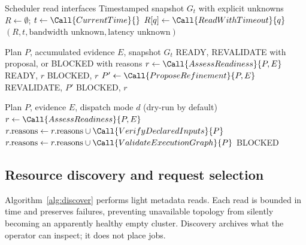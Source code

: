 \begin{algorithm}[H]
\caption{DiscoverClusterTopology: archive resource observations}\label{alg:discover}
\begin{algorithmic}[1]
\Require Scheduler read interfaces
\Ensure Timestamped snapshot $G_t$ with explicit unknowns
\State $R\gets\emptyset$; $t\gets\Call{CurrentTime}{}$
\State $R[q]\gets\Call{ReadWithTimeout}{q}$ 
\EndFor
\State \Return $(R,t,\text{bandwidth unknown},\text{latency unknown})$
\end{algorithmic}
\end{algorithm}
\begin{algorithm}[H]
\caption{ExecuteSmokeTestLoop: assess a bounded iteration}\label{alg:smoke}
\begin{algorithmic}[1]
\Require Plan $P$, accumulated evidence $E$, snapshot $G_t$
\Ensure READY, REVALIDATE with proposal, or BLOCKED with reasons
\State {} 
\State $r\gets\Call{AssessReadiness}{P,E}$ 
 \State \Return READY, $r$ \EndIf
{} \State \Return BLOCKED, $r$ \EndIf
\State $P'\gets\Call{ProposeRefinement}{P,E}$
\State \Return REVALIDATE, $P'$ 
\EndIf
\State \Return BLOCKED, $r$ 
\end{algorithmic}
\end{algorithm}
\begin{algorithm}[H]
\caption{OrchestrateFullExperiment: operator-facing dispatch}\label{alg:dispatch}
\begin{algorithmic}[1]
\Require Plan $P$, evidence $E$, dispatch mode $d$ (dry-run by default)
\State $r\gets\Call{AssessReadiness}{P,E}$
\State $r.\mathrm{reasons}\gets r.\mathrm{reasons}\cup\Call{VerifyDeclaredInputs}{P}$
\State $r.\mathrm{reasons}\gets r.\mathrm{reasons}\cup\Call{ValidateExecutionGraph}{P}$
\State {}
 \State \Return BLOCKED \EndIf
\State \Return {} 
\end{algorithmic}
\end{algorithm}

\subsection{Resource discovery and request selection}
Algorithm~\ref{alg:discover} performs light metadata reads. Each read is bounded in time and preserves failures, preventing unavailable topology from silently becoming an apparently healthy empty cluster. Discovery archives what the operator can inspect; it does not place jobs.

